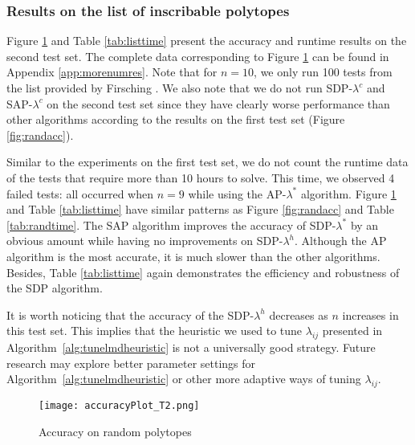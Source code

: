 \documentclass[smallextended, envcountsame]{svjour3}
\begin{document}
\subsubsection{Results on the list of inscribable polytopes}
    Figure \ref{fig:listacc} and Table \ref{tab:listtime} present the accuracy and runtime results on the second test set.  The complete data corresponding to Figure \ref{fig:listacc} can be found in Appendix \ref{app:morenumres}.  Note that for $n=10$, we only run 100 tests from the list provided by Firsching \cite{firsching2017realizability}.  We also note that we do not run SDP-$\lambda^c$ and SAP-$\lambda^c$ on the second test set since they have clearly worse performance than other algorithms according to the results on the first test set (Figure \ref{fig:randacc}).

    Similar to the experiments on the first test set, we do not count the runtime data of the tests that require more than 10 hours to solve.  This time, we observed 4 failed tests: all occurred when $n=9$ while using the AP-$\lambda^*$ algorithm.  Figure \ref{fig:listacc} and Table \ref{tab:listtime} have similar patterns as Figure \ref{fig:randacc} and Table \ref{tab:randtime}.  The SAP algorithm improves the accuracy of SDP-$\lambda^*$ by an obvious amount while having no improvements on SDP-$\lambda^h$.  Although the AP algorithm is the most accurate, it is much slower than the other algorithms.  Besides, Table \ref{tab:listtime} again demonstrates the efficiency and robustness of the SDP algorithm.

    It is worth noticing that the accuracy of the SDP-$\lambda^h$ decreases as $n$ increases in this test set.  This implies that the heuristic we used to tune $\lambda_{ij}$ presented in Algorithm~\ref{alg:tunelmdheuristic} is not a universally good strategy.  Future research may explore better parameter settings for Algorithm~\ref{alg:tunelmdheuristic} or other more adaptive ways of tuning $\lambda_{ij}$.
    \begin{figure}[!htb]
         \centering
         \texttt{[image: accuracyPlot\_T2.png]}
         \caption{Accuracy on random polytopes}
         \label{fig:listacc}
    \end{figure}\FloatBarrier
\end{document}
